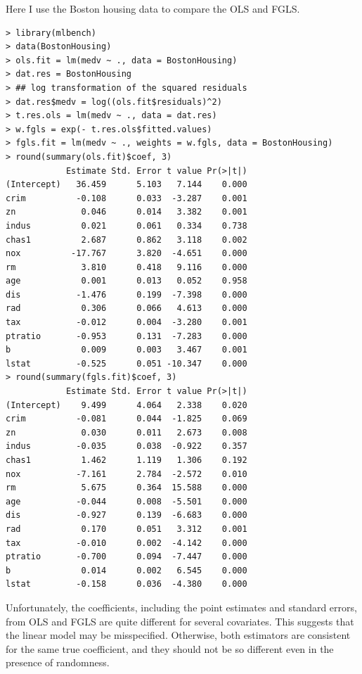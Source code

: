   
 




Here I use the Boston housing data to compare the OLS and FGLS.



\begin{lstlisting}
> library(mlbench)
> data(BostonHousing)
> ols.fit = lm(medv ~ ., data = BostonHousing)
> dat.res = BostonHousing
> ## log transformation of the squared residuals
> dat.res$medv = log((ols.fit$residuals)^2)
> t.res.ols = lm(medv ~ ., data = dat.res)
> w.fgls = exp(- t.res.ols$fitted.values)
> fgls.fit = lm(medv ~ ., weights = w.fgls, data = BostonHousing)
> round(summary(ols.fit)$coef, 3)
            Estimate Std. Error t value Pr(>|t|)
(Intercept)   36.459      5.103   7.144    0.000
crim          -0.108      0.033  -3.287    0.001
zn             0.046      0.014   3.382    0.001
indus          0.021      0.061   0.334    0.738
chas1          2.687      0.862   3.118    0.002
nox          -17.767      3.820  -4.651    0.000
rm             3.810      0.418   9.116    0.000
age            0.001      0.013   0.052    0.958
dis           -1.476      0.199  -7.398    0.000
rad            0.306      0.066   4.613    0.000
tax           -0.012      0.004  -3.280    0.001
ptratio       -0.953      0.131  -7.283    0.000
b              0.009      0.003   3.467    0.001
lstat         -0.525      0.051 -10.347    0.000
> round(summary(fgls.fit)$coef, 3)
            Estimate Std. Error t value Pr(>|t|)
(Intercept)    9.499      4.064   2.338    0.020
crim          -0.081      0.044  -1.825    0.069
zn             0.030      0.011   2.673    0.008
indus         -0.035      0.038  -0.922    0.357
chas1          1.462      1.119   1.306    0.192
nox           -7.161      2.784  -2.572    0.010
rm             5.675      0.364  15.588    0.000
age           -0.044      0.008  -5.501    0.000
dis           -0.927      0.139  -6.683    0.000
rad            0.170      0.051   3.312    0.001
tax           -0.010      0.002  -4.142    0.000
ptratio       -0.700      0.094  -7.447    0.000
b              0.014      0.002   6.545    0.000
lstat         -0.158      0.036  -4.380    0.000
\end{lstlisting}

Unfortunately, the coefficients, including the point estimates and standard errors, from OLS and FGLS are quite different for several covariates. This suggests that the linear model may be misspecified. Otherwise, both estimators are consistent for the same true coefficient, and they should not be so different even in the presence of randomness. 



